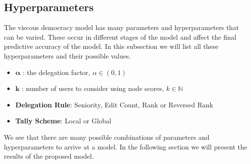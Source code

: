 \subsection{Hyperparameters}
The viscous democracy model has many parameters and hyperparameters that can be varied. These occur in different stages of the model and affect the final predictive accuracy of the model. In this subsection we will list all these hyperparameters and their possible values.

\begin{itemize}
    \item $\boldsymbol{\alpha}$ : the delegation factor, $\alpha\in (0,1)$
    \item $\mathbf{k}$ : number of users to consider using node scores, $k \in \mathbb{N}$
    \item \textbf{Delegation Rule}: Seniority, Edit Count, Rank or Reversed Rank 
    \item \textbf{Tally Scheme}: Local or Global
\end{itemize}
We see that there are many possible combinations of parameters and hyperparameters to arrive at a model. In the following section we will present the results of the proposed model. 